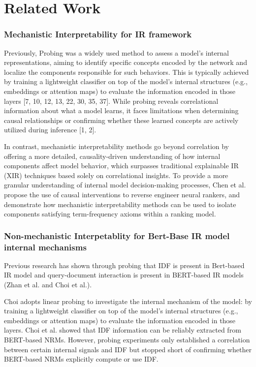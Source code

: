 \section{Related Work}
\subsubsection{Mechanistic Interpretability for IR framework} Previously, Probing was a widely used method to assess a model’s internal representations, aiming to identify specific concepts encoded by the network and localize the components responsible for such behaviors. This is typically achieved by training a lightweight classifier on top of the model's internal structures (e.g., embeddings or attention maps) to evaluate the information encoded in those layers [7, 10, 12, 13, 22, 30, 35, 37]. While probing reveals correlational information about what a model learns, it faces limitations when determining causal relationships or confirming whether these learned concepts are actively utilized during inference [1, 2]. 

In contrast, mechanistic interpretability methods go beyond correlation by offering a more detailed, causality-driven understanding of how internal components affect model behavior, which surpasses traditional explainable IR (XIR) techniques based solely on correlational insights. To provide a more granular understanding of internal model decision-making processes, Chen et al. propose the use of causal interventions to reverse engineer neural rankers, and demonstrate how mechanistic interpretability methods can be used to isolate components satisfying term-frequency axioms within a ranking model.

\subsubsection{Non-mechanistic Interpetablity for Bert-Base IR model internal mechanisms} Previous research has shown through probing that IDF is present in Bert-based IR model and query-document interaction is present in BERT-based IR models (Zhan et al. and Choi et al.). 

Choi adopts linear probing to investigate the internal mechanism of the model: by training a lightweight classifier on top of the model's internal structures (e.g., embeddings or attention maps) to evaluate the information encoded in those layers. Choi et al. showed that IDF information can be reliably extracted from BERT-based NRMs. However, probing experiments only established a correlation between certain internal signals and IDF but stopped short of confirming whether BERT-based NRMs explicitly compute or use IDF.  


